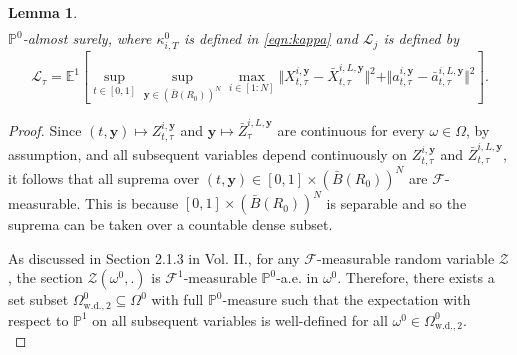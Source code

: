 \documentclass{article}
\newtheorem{lemma}[theorem]{Lemma}
\newtheorem{corollary}[theorem]{Corollary}
\begin{document}
\begin{appendices}
\begin{lemma}
\begin{align*}
\end{align*}
$\mathbb P^0$-almost surely, where $\kappa^0_{i,T}$ is defined in \eqref{eqn:kappa} and $\mathscr{L}_j$ is defined by
\begin{equation}\label{eqn:mathscr_L}
    \mathscr{L}_{\tau} =\mathbb E^1 \left[\sup_{t\in [0,1]}\sup_{\bm{y}\in (\bar B(R_0))^N}\max_{i\in[1:N]} \Vert X^{i,\bm{y}}_{t,\tau}-\bar X^{i,L,\bm{y}}_{t,\tau}\Vert^2+\Vert a^{i,\bm{y}}_{t,\tau}-\bar a^{i,L,\bm{y}}_{t,\tau}\Vert^2\right].
\end{equation}
\end{lemma}
\begin{proof}
Since $(t,\bm{y})\mapsto Z^{i,\bm{y}}_{t,\tau}$ and $\bm{y}\mapsto\bar Z^{i,L,\bm{y}}_{\tau}$ are continuous for every $\omega\in\Omega$, by assumption, and all subsequent variables depend continuously on $Z^{i,\bm{y}}_{t,\tau}$ and $\bar Z^{i,L,\bm{y}}_{t,\tau}$, it follows that all suprema over $(t,\bm{y})\in[0,1]\times (\bar B(R_0))^N$ are $\mathcal F$-measurable. This is because $[0,1]\times (\bar B(R_0))^N$ is separable and so the suprema can be taken over a countable dense subset.

As discussed in Section 2.1.3 in \cite{carmona2018probabilistic} Vol. II., for any $\mathcal F$-measurable random variable $\mathcal Z$, the section $\mathcal Z(\omega^0,.)$ is $\mathcal F^1$-measurable $\mathbb P^0$-a.e. in $\omega^0$. Therefore, there exists a set subset $\Omega^0_{\mathrm{w.d.,2}}\subseteq \Omega^0$ with full $\mathbb P^0$-measure such that the expectation with respect to $\mathbb P^1$ on all subsequent variables is well-defined for all $\omega^0\in \Omega^0_{\mathrm{w.d.,2}}$.   \\


\end{proof}
\end{appendices}
\end{document}
